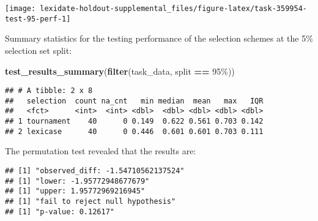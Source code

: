 \documentclass[
]{book}
\newenvironment{Shaded}{\begin{snugshade}}{\end{snugshade}}
\newcommand{\AttributeTok}[1]{\textcolor[rgb]{0.13,0.29,0.53}{#1}}
\newcommand{\DecValTok}[1]{\textcolor[rgb]{0.00,0.00,0.81}{#1}}
\newcommand{\FunctionTok}[1]{\textcolor[rgb]{0.13,0.29,0.53}{\textbf{#1}}}
\newcommand{\NormalTok}[1]{#1}
\newcommand{\OtherTok}[1]{\textcolor[rgb]{0.56,0.35,0.01}{#1}}
\newcommand{\SpecialCharTok}[1]{\textcolor[rgb]{0.81,0.36,0.00}{\textbf{#1}}}
\newcommand{\StringTok}[1]{\textcolor[rgb]{0.31,0.60,0.02}{#1}}
\begin{document}
\texttt{[image: lexidate-holdout-supplemental\_files/figure-latex/task-359954-test-95-perf-1]}

Summary statistics for the testing performance of the selection schemes at the 5\% selection set split:

\begin{Shaded}
\begin{Highlighting}[]
\FunctionTok{test\_results\_summary}\NormalTok{(}\FunctionTok{filter}\NormalTok{(task\_data, split }\SpecialCharTok{==} \StringTok{\textquotesingle{}95\%\textquotesingle{}}\NormalTok{))}
\end{Highlighting}
\end{Shaded}

\begin{verbatim}
## # A tibble: 2 x 8
##   selection  count na_cnt   min median  mean   max   IQR
##   <fct>      <int>  <int> <dbl>  <dbl> <dbl> <dbl> <dbl>
## 1 tournament    40      0 0.149  0.622 0.561 0.703 0.142
## 2 lexicase      40      0 0.446  0.601 0.601 0.703 0.111
\end{verbatim}

The permutation test revealed that the results are:

\begin{Shaded}
\end{Shaded}

\begin{verbatim}
## [1] "observed_diff: -1.54710562137524"
## [1] "lower: -1.95772948677679"
## [1] "upper: 1.95772969216945"
## [1] "fail to reject null hypothesis"
## [1] "p-value: 0.12617"
\end{verbatim}
\end{document}
